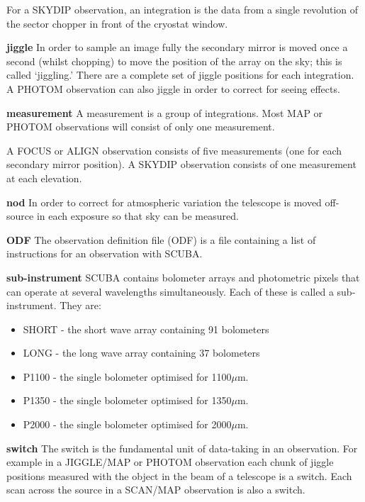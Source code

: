 \documentclass[twoside,11pt]{starlink}
\providecommand{\micronm}          {$\mu$m}
\begin{document}
\begin{description}
For a SKYDIP observation, an integration is the data from a single revolution
of the sector chopper in front of the cryostat window.


\item{\textbf{jiggle}} In order to sample an image fully the secondary mirror
is moved once a second (whilst chopping) to move the position of the array on
the sky; this is called `jiggling.'  There are a  complete set of jiggle
positions for each integration. A PHOTOM observation can also jiggle in order
to correct for seeing effects.

\item{\textbf{measurement}} A measurement is a group of integrations. Most MAP or
PHOTOM observations will consist of only one measurement.

A FOCUS or ALIGN observation consists of five measurements (one for each
secondary mirror position). A SKYDIP observation consists of one measurement
at each elevation.

\item{\textbf{nod}} In order to correct for atmospheric variation the telescope
is moved off-source in each exposure so that sky can be measured.

\item{\textbf{ODF}} The observation definition file (ODF) is a file containing a
list of instructions for an observation with SCUBA.

\item{\textbf{sub-instrument}} SCUBA contains bolometer arrays and photometric
pixels that can operate at several wavelengths simultaneously. Each of these
is called a sub-instrument. They are:

\begin{itemize}
\item SHORT - the short wave array containing 91 bolometers
\item LONG - the long wave array containing 37 bolometers
\item P1100 - the single bolometer optimised for 1100\micronm.
\item P1350 - the single bolometer optimised for 1350\micronm.
\item P2000 - the single bolometer optimised for 2000\micronm.
\end{itemize}


\item{\textbf{switch}} The switch is the fundamental unit of data-taking in an
observation. For example in a JIGGLE/MAP or PHOTOM observation each chunk of
jiggle positions measured with the object in the beam of a telescope is a
switch. Each scan across the source in a SCAN/MAP observation is also a switch.


\end{description}
\end{document}
